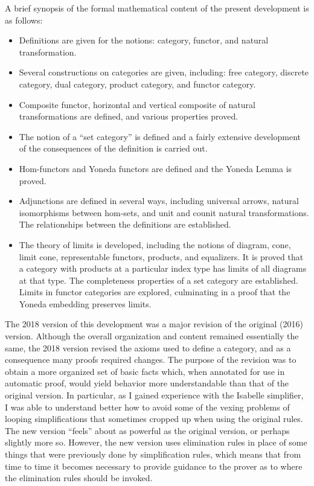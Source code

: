 \documentclass[11pt,notitlepage,a4paper]{report}
\begin{document}
A brief synopsis of the formal mathematical content of the present development is as follows:
\begin{itemize}
\item  Definitions are given for the notions: category, functor, and natural transformation.
\item  Several constructions on categories are given, including: free category,
  discrete category, dual category, product category, and functor category.
\item  Composite functor, horizontal and vertical composite of natural transformations
  are defined, and various properties proved.
\item  The notion of a ``set category'' is defined and a fairly extensive development
  of the consequences of the definition is carried out.
\item  Hom-functors and Yoneda functors are defined and the Yoneda Lemma is proved.
\item  Adjunctions are defined in several ways, including universal arrows,
  natural isomorphisms between hom-sets, and unit and counit natural transformations.
  The relationships between the definitions are established.
\item  The theory of limits is developed, including the notions of diagram, cone, limit cone,
  representable functors, products, and equalizers.  It is proved that a category with
  products at a particular index type has limits of all diagrams at that type.
  The completeness properties of a set category are established.
  Limits in functor categories are explored, culminating in a proof that the Yoneda
  embedding preserves limits.
\end{itemize}

The 2018 version of this development was a major revision of the original (2016)
version.  Although the overall organization and content remained essentially the same,
the 2018 version revised the axioms used to define a category, and as a consequence
many proofs required changes.  The purpose of the revision was to obtain a more organized
set of basic facts which, when annotated for use in automatic proof, would yield behavior more
understandable than that of the original version.  In particular, as I gained experience with
the Isabelle simplifier, I was able to understand better how to avoid some of the vexing
problems of looping simplifications that sometimes cropped up when using the original rules.
The new version ``feels'' about as powerful as the original version, or perhaps slightly more so.
However, the new version uses elimination rules in place of some things that were previously
done by simplification rules, which means that from time to time it becomes necessary
to provide guidance to the prover as to where the elimination rules should be invoked.
\end{document}
